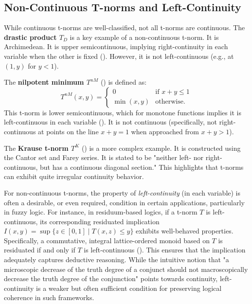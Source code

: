 \subsection{Non-Continuous T-norms and Left-Continuity}
While continuous t-norms are well-classified, not all t-norms are continuous.
The \textbf{drastic product $T_D$} is a key example of a non-continuous t-norm. It is Archimedean. It is upper semicontinuous, implying right-continuity in each variable when the other is fixed (\cite[Rem.~1.21(i), Prop.~1.22]{Klement2000}). However, it is not left-continuous (e.g., at $(1,y)$ for $y<1$).

The \textbf{nilpotent minimum $T^{nM}$} (\cite[Rem.~1.21(i), p.~16]{Klement2000}) is defined as:
  \[
  T^{nM}(x,y) =
  \begin{cases}
    0 & \text{if } x+y \leq 1 \\
    \min(x,y) & \text{otherwise.}
  \end{cases}
  \]
This t-norm is lower semicontinuous, which for monotone functions implies it is left-continuous in each variable (\cite[Prop.~1.22, p.~17]{Klement2000}). It is not continuous (specifically, not right-continuous at points on the line $x+y=1$ when approached from $x+y>1$).

The \textbf{Krause t-norm $T^K$} (\cite[App.~B.1, Thm.~B.1]{Klement2000}) is a more complex example. It is constructed using the Cantor set and Farey series. It is stated to be "neither left- nor right-continuous, but has a continuous diagonal section." This highlights that t-norms can exhibit quite irregular continuity behavior.

\begin{remark}
For non-continuous t-norms, the property of \emph{left-continuity} (in each variable) is often a desirable, or even required, condition in certain applications, particularly in fuzzy logic. For instance, in residuum-based logics, if a t-norm $T$ is left-continuous, its corresponding residuated implication $I(x,y) = \sup\{z \in [0,1] \mid T(x,z) \le y\}$ exhibits well-behaved properties. Specifically, a commutative, integral lattice-ordered monoid based on $T$ is residuated if and only if $T$ is left-continuous (\cite[Prop.~2.47, p.~63]{Klement2000}). This ensures that the implication adequately captures deductive reasoning. While the intuitive notion that "a microscopic decrease of the truth degree of a conjunct should not macroscopically decrease the truth degree of the conjunction" points towards continuity, left-continuity is a weaker but often sufficient condition for preserving logical coherence in such frameworks.
\end{remark}


